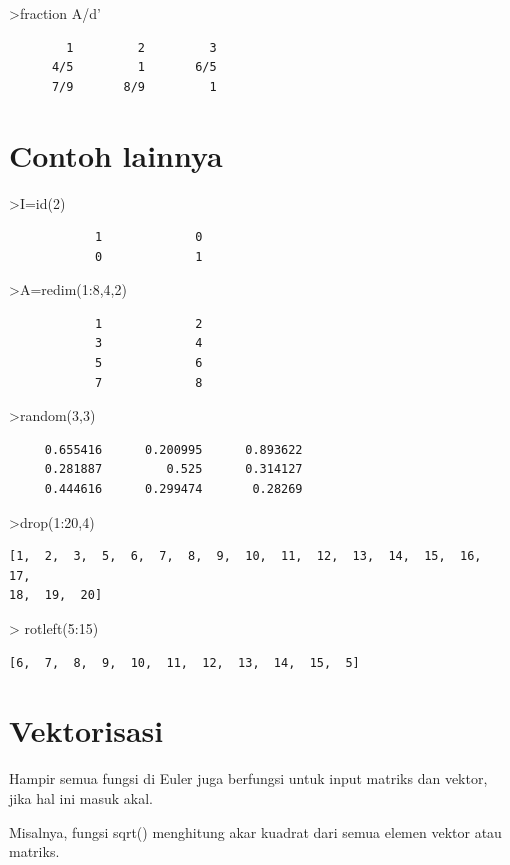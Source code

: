 \documentclass[
]{book}
\begin{document}
\textgreater fraction A/d'

\begin{verbatim}
        1         2         3 
      4/5         1       6/5 
      7/9       8/9         1 
\end{verbatim}

\chapter{Contoh lainnya}\label{contoh-lainnya-11}

\textgreater I=id(2)

\begin{verbatim}
            1             0 
            0             1 
\end{verbatim}

\textgreater A=redim(1:8,4,2)

\begin{verbatim}
            1             2 
            3             4 
            5             6 
            7             8 
\end{verbatim}

\textgreater random(3,3)

\begin{verbatim}
     0.655416      0.200995      0.893622 
     0.281887         0.525      0.314127 
     0.444616      0.299474       0.28269 
\end{verbatim}

\textgreater drop(1:20,4)

\begin{verbatim}
[1,  2,  3,  5,  6,  7,  8,  9,  10,  11,  12,  13,  14,  15,  16,  17,
18,  19,  20]
\end{verbatim}

\textgreater{} rotleft(5:15)

\begin{verbatim}
[6,  7,  8,  9,  10,  11,  12,  13,  14,  15,  5]
\end{verbatim}

\chapter{Vektorisasi}\label{vektorisasi}

Hampir semua fungsi di Euler juga berfungsi untuk input matriks dan vektor, jika hal ini masuk akal.

Misalnya, fungsi sqrt() menghitung akar kuadrat dari semua elemen vektor atau matriks.
\end{document}
